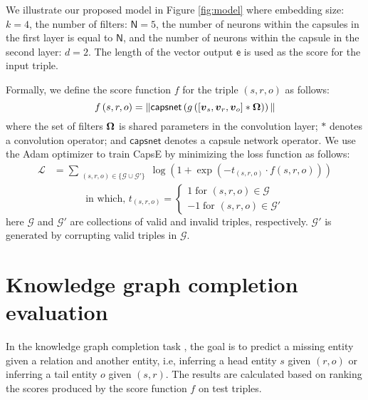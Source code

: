 \documentclass[11pt,a4paper]{article}
\begin{document}
We illustrate our proposed model in Figure \ref{fig:model} where embedding size: $k=4$, the number of filters: $\mathsf{N}=5$, the number of neurons within the capsules in the first layer is equal to $\mathsf{N}$, and the number of neurons within the capsule in the second layer: $d = 2$. The length of the vector output $\boldsymbol{\mathsf{e}}$ is used as the score for the input triple. 

Formally, we define the score function $f$ for the triple $(s, r, o)$ as follows:
\begin{equation}
f\left(s,r,o\right) = \|\mathsf{capsnet}\left(g\left([\boldsymbol{v}_s,\boldsymbol{v}_r,\boldsymbol{v}_o]\ast\bold{\Omega}\right)\right)\| \nonumber
\label{equa:model}
\end{equation}
where the set of filters $\bold{\Omega}$ is shared parameters in the convolution layer; $\ast$ denotes a convolution operator; and $\mathsf{capsnet}$ denotes a capsule network operator.
We use the Adam optimizer \citep{kingma2014adam} to train CapsE by minimizing the loss function \citep{Trouillon2016,Nguyen2018} as follows:
\begin{align}
\mathcal{L} & =  \sum_{\substack{(s, r, o) \in \{\mathcal{G} \cup \mathcal{G}'\}}} \log\left(1 + \exp\left(- t_{(s, r, o)} \cdot f\left(s,r,o\right)\right)\right) \nonumber
 \label{equal:objfunc}
  \end{align}
  \vspace{-10pt}
\begin{equation*}
\text{in which, } t_{(s, r, o)} = \left\{ 
  \begin{array}{l}
  1\;\text{for } (s, r, o)\in\mathcal{G}\\
 -1\;\text{for } (s, r, o)\in\mathcal{G}'
  \end{array} \right.
\end{equation*}
here $\mathcal{G}$  and $\mathcal{G}'$  are collections of valid and invalid triples, respectively.  $\mathcal{G}'$ is generated by corrupting valid triples in $\mathcal{G}$. 




\section{Knowledge graph completion evaluation }\label{ssec:kbc}
In the knowledge graph completion task \citep{NIPS2013_5071}, the goal is to predict a missing entity given a relation and another entity, i.e, inferring a head entity $s$ given $(r, o)$ or inferring a tail entity $o$ given $(s, r)$. 
The results are calculated based on ranking the scores produced by the score function $f$ on test triples.
\end{document}
